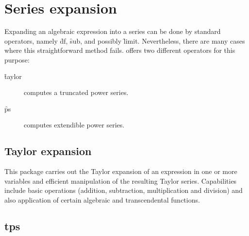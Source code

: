 \section{Series expansion}

Expanding an algebraic expression into a series can be done by standard \REDUCE operators, namely \f{df}, \f{sub}, and possibly \f{limit}.
Nevertheless, there are many cases where this straightforward method fails.
\REDUCE offers two different operators for this purpose:
\begin{description}
\item[\f{taylor}] computes a truncated power series.
\item[\f{ps}] computes extendible power series.
\end{description}

\subsection{Taylor expansion}
This package carries out the Taylor expansion of an expression in one
or more variables and efficient manipulation of the resulting Taylor
series. Capabilities include basic operations (addition, subtraction,
multiplication and division) and also application of certain algebraic
and transcendental functions.



\subsection{tps}

